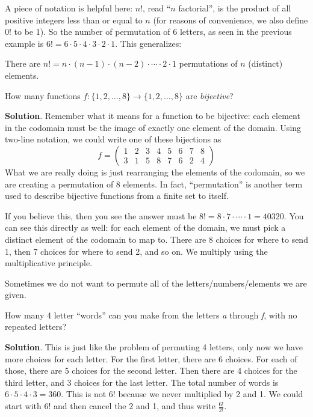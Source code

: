 \documentclass[11pt,]{book}
\theoremstyle{ptxplainnotitle}
\theoremstyle{ptxplaintitle}
\theoremstyle{ptxdefinitionnotitle}
\theoremstyle{ptxdefinitiontitle}
\theoremstyle{ptxdefinitionnotitle}
\theoremstyle{ptxdefinitiontitle}
\theoremstyle{ptxdefinitionnotitle}
\theoremstyle{ptxdefinitiontitle}
\theoremstyle{ptxdefinitiontitlenonumber}
\theoremstyle{ptxdefinitiontitlenonumber}
\numberwithin{equation}{chapter}
\newcommand{\twoline}[2]{\begin{pmatrix}#1 \\ #2 \end{pmatrix}}
\newcommand{\amp}{&}
\begin{document}
\hypertarget{p-1518}{}%
A piece of notation is helpful here: \(n!\), read ``\(n\) factorial'', is the product of all positive integers less than or equal to \(n\) (for reasons of convenience, we also define 0! to be 1). So the number of permutation of 6 letters, as seen in the previous example is \(6! = 6\cdot 5 \cdot 4 \cdot 3 \cdot 2 \cdot 1\). This generalizes:%
\begin{assemblage}\label{assemblage-21}
\hypertarget{p-1519}{}%
There are \(n! = n\cdot (n-1)\cdot (n-2)\cdot \cdots \cdot 2\cdot 1\) permutations of \(n\) (distinct) elements.%
\end{assemblage}
\begin{example}\label{example-counting-functions-bijective}
\hypertarget{p-1520}{}%
How many functions \(f:\{1,2,\ldots,8\} \to \{1,2,\ldots, 8\}\) are \emph{bijective}?%
\par\smallskip%
\noindent\textbf{Solution}.\hypertarget{solution-200}{}\quad%
\hypertarget{p-1521}{}%
Remember what it means for a function to be bijective: each element in the codomain must be the image of exactly one element of the domain. Using two-line notation, we could write one of these bijections as%
\begin{equation*}
f = \twoline{1 \amp 2 \amp 3 \amp 4 \amp 5 \amp 6 \amp 7 \amp 8} {3 \amp 1 \amp 5 \amp 8 \amp 7 \amp 6 \amp 2 \amp 4}
\end{equation*}
What we are really doing is just rearranging the elements of the codomain, so we are creating a permutation of 8 elements. In fact, ``permutation'' is another term used to describe bijective functions from a finite set to itself.%
\par
\hypertarget{p-1522}{}%
If you believe this, then you see the answer must be \(8! = 8 \cdot 7 \cdot\cdots\cdot 1 = 40320\). You can see this directly as well: for each element of the domain, we must pick a distinct element of the codomain to map to. There are 8 choices for where to send 1, then 7 choices for where to send 2, and so on. We multiply using the multiplicative principle.%
\end{example}
\hypertarget{p-1523}{}%
Sometimes we do not want to permute all of the letters/numbers/elements we are given.%
\begin{example}\label{example-44}
\hypertarget{p-1524}{}%
How many 4 letter ``words'' can you make from the letters \emph{a} through \emph{f}, with no repeated letters?%
\par\smallskip%
\noindent\textbf{Solution}.\hypertarget{solution-201}{}\quad%
\hypertarget{p-1525}{}%
This is just like the problem of permuting 4 letters, only now we have more choices for each letter. For the first letter, there are 6 choices. For each of those, there are 5 choices for the second letter. Then there are 4 choices for the third letter, and 3 choices for the last letter. The total number of words is \(6\cdot 5\cdot 4 \cdot 3 = 360\). This is not \(6!\) because we never multiplied by 2 and 1. We could start with \(6!\) and then cancel the 2 and 1, and thus write \(\frac{6!}{2!}\).%
\end{example}
\end{document}

